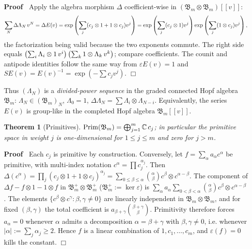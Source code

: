 \documentclass{article}
\newcommand{\assign}{:=}
\newcommand{\tmem}[1]{{\em #1\/}}
\newcommand{\tmop}[1]{\ensuremath{\operatorname{#1}}}
\newenvironment{proof}{\noindent\textbf{Proof\ }}{\hspace*{\fill}$\Box$\medskip}
\newtheorem{theorem}{Theorem}
\newcommand{\Prim}{\tmop{Prim}}
\newcommand{\CA}{\mathfrak{B}}
\newcommand{\C}{\mathbb{C}}
\begin{document}
\begin{proof}
  Apply the algebra morphism $\Delta$ coefficient-wise in $(\CA_m \otimes
  \CA_m) [[v]]$:
  \[ \sum_N \Delta \Lambda_N  \hspace{0.17em} v^N = \Delta E (v) = \exp \left(
     \sum_j (c_j \otimes 1 + 1 \otimes c_j) v^j \right) = \exp \left( \sum_j
     (c_j \otimes 1) v^j \right) \exp \left( \sum_j (1 \otimes c_j) v^j
     \right), \]
  the factorization being valid because the two exponents commute. The right
  side equals $\left( \sum_i \Lambda_i \otimes 1 \hspace{0.17em} v^i \right)
  \left( \sum_k 1 \otimes \Lambda_k  \hspace{0.17em} v^k \right)$; compare
  coefficients. The counit and antipode identities follow the same way from
  $\varepsilon E (v) = 1$ and $SE (v) = E (v)^{- 1} = \exp (- \sum c_j v^j)$.
\end{proof}

Thus $(\Lambda_N)$ is a {\tmem{divided-power sequence}} in the graded
connected Hopf algebra $\CA_m$: $\Lambda_N \in (\CA_m)_N$, $\Lambda_0 = 1$,
$\Delta \Lambda_N = \sum \Lambda_i \otimes \Lambda_{N - i}$. Equivalently, the
series $E (v)$ is group-like in the completed Hopf algebra $\CA_m [[v]]$.

\begin{theorem}
  [Primitives]\label{thm:primitives} $\Prim (\CA_m) = \bigoplus_{j = 1}^m \C
  \hspace{0.17em} c_j$; in particular the primitive space in weight $j$ is
  one-dimensional for $1 \le j \le m$ and zero for $j > m$.
\end{theorem}

\begin{proof}
  Each $c_j$ is primitive by construction. Conversely, let $f = \sum_{\alpha}
  a_{\alpha} c^{\alpha}$ be primitive, with multi-index notation $c^{\alpha} =
  \prod c_j^{\alpha_j}$. Then $\Delta (c^{\alpha}) = \prod_j (c_j \otimes 1 +
  1 \otimes c_j)^{\alpha_j} = \sum_{0 \le \beta \le \alpha}
  \binom{\alpha}{\beta} c^{\beta} \otimes c^{\alpha - \beta}$. The component
  of $\Delta f - f \otimes 1 - 1 \otimes f$ in $\CA_m^+ \otimes \CA_m^+$
  ($\CA_m^+ \assign \ker \varepsilon$) is $\sum_{\alpha} a_{\alpha}  \sum_{0 <
  \beta < \alpha} \binom{\alpha}{\beta} c^{\beta} \otimes c^{\alpha - \beta}$.
  The elements $\{c^{\beta} \otimes c^{\gamma} : \beta, \gamma \ne 0\}$ are
  linearly independent in $\CA_m \otimes \CA_m$, and for fixed $(\beta,
  \gamma)$ the total coefficient is $a_{\beta + \gamma} \binom{\beta +
  \gamma}{\beta}$. Primitivity therefore forces $a_{\alpha} = 0$ whenever
  $\alpha$ admits a decomposition $\alpha = \beta + \gamma$ with $\beta,
  \gamma \ne 0$, i.e. whenever $| \alpha | \assign \sum_j \alpha_j \ge 2$.
  Hence $f$ is a linear combination of $1, c_1, \ldots, c_m$, and $\varepsilon
  (f) = 0$ kills the constant.
\end{proof}
\end{document}

